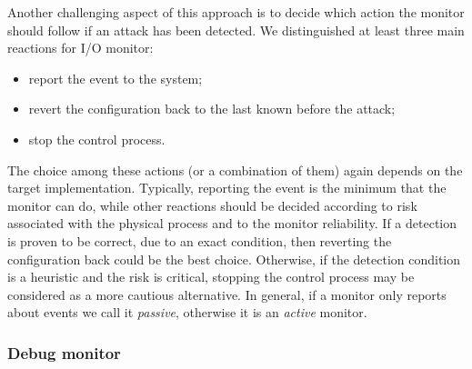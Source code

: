 Another challenging aspect of this approach is to decide which action the monitor should follow if an attack has been detected.
We distinguished at least three main reactions for I/O monitor:
\begin{itemize}
	\item report the event to the system;
	\item revert the configuration back to the last known before the attack;
	\item stop the control process.
\end{itemize}
The choice among these actions (or a combination of them) again depends on the target implementation.
Typically, reporting the event is the minimum that the monitor can do, while other reactions should be decided according to risk associated with the physical process
and to the monitor reliability. If a detection is proven to be correct, due to an exact condition,
then reverting the configuration back could be the best choice. Otherwise, if the detection condition is a heuristic and the risk is critical,
stopping the control process may be considered as a more cautious alternative.
In general, if a monitor only reports about events we call it \emph{passive}, otherwise it is an \emph{active} monitor.


\subsubsection{Debug monitor}

